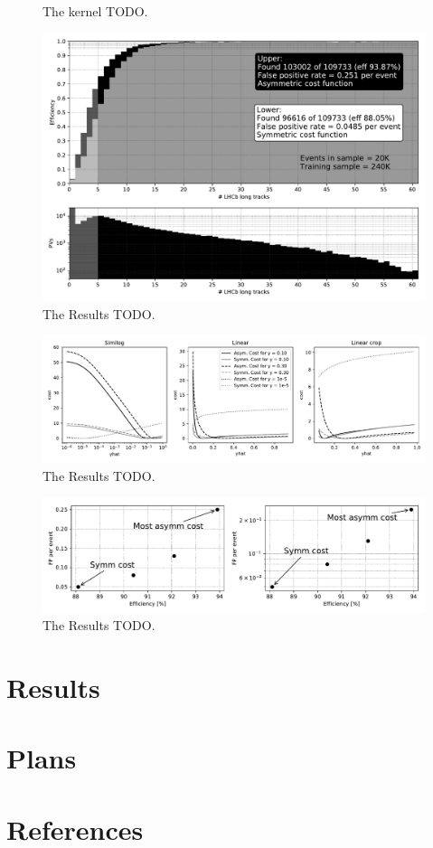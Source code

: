 \documentclass[a4paper]{jpconf}
\begin{document}
\begin{figure}
	\centering
	
	\caption{The kernel TODO.}
	\label{fig:kernel}
\end{figure}

\begin{figure}
	\centering
	\includegraphics[width=\textwidth]{images/effntrackspaper.pdf}
	\caption{The Results TODO.}
    \label{fig:results}
\end{figure}

\begin{figure}
	\centering
	\includegraphics[width=\textwidth]{images/LossPaper.pdf}
	\caption{The Results TODO.}
	\label{fig:loss}
\end{figure}

\begin{figure}
	\centering
	\includegraphics[width=.8\textwidth]{images/EffVsFP2paper.pdf}
	\caption{The Results TODO.}
	\label{fig:efffp}
\end{figure}




\section{Results}

\section{Plans}

\section*{References}


\end{document}
